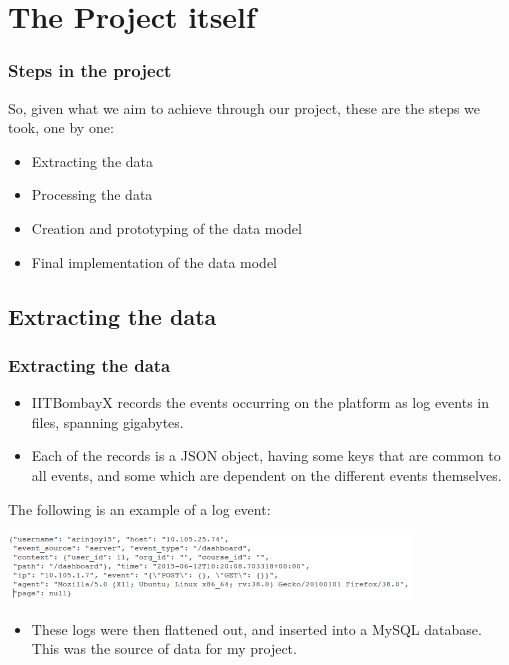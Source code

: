 \documentclass[12pt,xcolor=dvipsnames]{beamer}
\begin{document}
\section{The Project itself}
\begin{frame}[t]
\frametitle{Steps in the project}

So, given what we aim to achieve through our project, these are the steps we took, one by one:

\begin{itemize}
\item Extracting the data
\item Processing the data
\item Creation and prototyping of the data model
\item Final implementation of the data model
\end{itemize}

\end{frame}

\subsection{Extracting the data}
\begin{frame}[t]
\frametitle{Extracting the data}

\begin{itemize}

\item IITBombayX records the events occurring on the platform as log events in files, spanning gigabytes.

\item Each of the records is a JSON object, having some keys that are common to all events, and some which are dependent on the different events themselves.

\end{itemize}

The following is an example of a log event:

\begin{center}
\includegraphics[height=1.8cm]{Diag1.png}\\ %
\end{center}

\begin{itemize}
\item These logs were then flattened out, and inserted into a MySQL database. This was the source of data for my project.
\end{itemize}

\end{frame}
\end{document}
